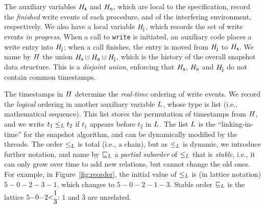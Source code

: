 The auxiliary variables $H_{\mathsf{s}}$ and $H_{\mathsf{o}}$, which are local to the
specification, record the \emph{finished} write events of each
procedure, and of the interfering environment, respectively.  We also
have a local variable $H_{\mathsf{j}}$, which records the set of write events
\emph{in progress}. When a call to {\tt write} is initiated, an
auxiliary code places a write entry into $H_{\mathsf{j}}$; when a call
finishes, the entry is moved from $H_{\mathsf{j}}$ to $H_{\mathsf{s}}$.
%
%
We name by $H$ the union $\histS \hunion \histO \hunion \histJ$,
which is the history of the overall snapshot data structure. This is a
\emph{disjoint union}, enforcing that $H_{\mathsf{s}}$, $H_{\mathsf{o}}$ and $H_{\mathsf{j}}$
do not contain common timestamps.

The timestamps in $H$ determine the \emph{real-time} ordering of
write events. We record the \emph{logical} ordering in another
auxiliary variable $L$, whose type is list (i.e., mathematical
sequence). This list stores the permutation of timestamps from
$H$, and we write $t_1 \mathrel{\leq_L} t_2$ if $t_1$ appears before $t_2$ in
$L$. The list $L$ is the ``linking-in-time'' for the
snapshot algorithm, and can be dynamically modified by the threads.
%
%
The order $\mathrel{\leq_L}$ is total (i.e., a chain), but as $\mathrel{\leq_L}$ is dynamic,
we introduce further notation, and name by $\mathrel{\sqsubseteq_L}$ a \emph{partial
  suborder} of $\mathrel{\leq_L}$ that is \emph{stable}, i.e., it can only grow
over time to add new relations, but cannot change the old ones. 
%
For example, in Figure~\ref{fig:reorder}, the initial value of $\mathrel{\leq_L}$ is
(in lattice notation) $5{-}0{-}2{-}3{-}1$, which changes to $5{-}0{-}2{-}1{-}3$. Stable
order $\mathrel{\sqsubseteq_L}$ is the lattice
$5{-}0{-}2{<}\!\!\!\begin{array}[c]{c}1\\ 3\end{array}\!\!\!$: $1$ and $3$ are unrelated.

